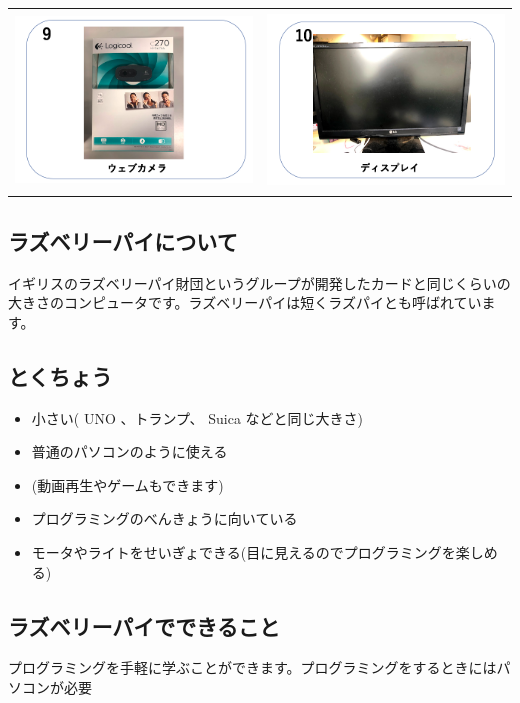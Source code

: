 \documentclass[a4paper,12pt]{jarticle}
\begin{document}
\begin{tabular}{cc}
  \includegraphics[width=6.488cm,height=4.697cm]{textbook-img002.png}
   &
  \includegraphics[width=6.488cm,height=4.697cm]{textbook-img001.png} \\
\end{tabular}

\subsection{ラズベリーパイについて}
イギリスのラズベリーパイ財団というグループが開発したカードと同じくらいの大きさのコンピュータです。ラズベリーパイは短くラズパイとも呼ばれています。

\subsection{とくちょう}
\begin{itemize}
  \item 小さい( UNO 、トランプ、 Suica
        などと同じ大きさ)
  \item 普通のパソコンのように使える
  \item (動画再生やゲームもできます)
  \item
        プログラミングのべんきょうに向いている
  \item
        モータやライトをせいぎょできる(目に見えるのでプログラミングを楽しめる)
\end{itemize}
\subsection{ラズベリーパイでできること}
プログラミングを手軽に学ぶことができます。プログラミングをするときにはパソコンが必要
\end{document}
